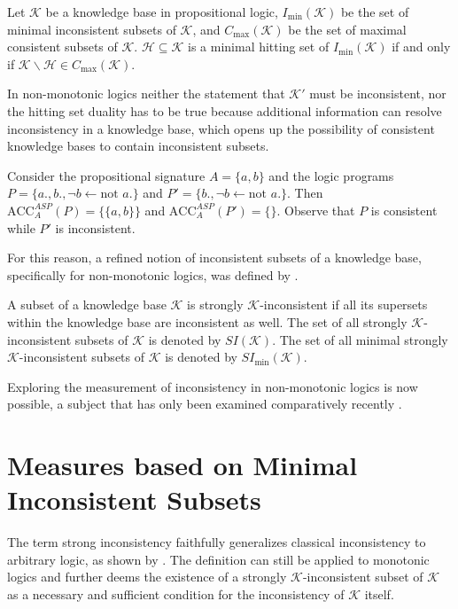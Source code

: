 \begin{theorem}
    Let \(\mathcal{K}\) be a knowledge base in propositional logic, \(I_{\min}(\mathcal{K})\) be the set of minimal inconsistent subsets of \(\mathcal{K}\), and \(C_{\max}(\mathcal{K})\) be the set of maximal consistent subsets of \(\mathcal{K}\). \(\mathcal{H} \subseteq \mathcal{K}\) is a minimal hitting set of \(I_{\min}(\mathcal{K})\) if and only if \(\mathcal{K} \backslash \mathcal{H} \in C_{\max}(\mathcal{K})\).
\end{theorem}

In non-monotonic logics neither the statement that \(\mathcal{K}'\) must be inconsistent, nor the hitting set duality has to be true because additional information can resolve inconsistency in a knowledge base, which opens up the possibility of consistent knowledge bases to contain inconsistent subsets.

\begin{example}
    Consider the propositional signature \(A = \{a, b\}\) and the logic programs \(P = \{a., b., \neg b \leftarrow \text{not }a.\}\) and \(P' = \{b., \neg b \leftarrow \text{not }a.\}\). Then \(\text{ACC}_A^{ASP}(P) = \{\{a,b\}\}\) and \(\text{ACC}_A^{ASP}(P') = \{\}\). Observe that \(P\) is consistent while \(P'\) is inconsistent.
\end{example}

For this reason, a refined notion of inconsistent subsets of a knowledge base, specifically for non-monotonic logics, was defined by \cite{brewka_strong_2017}.
\begin{definition}
    A subset of a knowledge base \(\mathcal{K}\) is strongly \(\mathcal{K}\)-inconsistent if all its supersets within the knowledge base are inconsistent as well. The set of all strongly \(\mathcal{K}\)-inconsistent subsets of \(\mathcal{K}\) is denoted by \(SI(\mathcal{K})\). The set of all minimal strongly \(\mathcal{K}\)-inconsistent subsets of \(\mathcal{K}\) is denoted by \(SI_{\min}(\mathcal{K})\).
\end{definition}

Exploring the measurement of inconsistency in non-monotonic logics is now possible, a subject that has only been examined comparatively recently \cite{ulbricht_measuring_2018} \cite{brewka_strong_2019} \cite{ulbricht_handling_2020}.

\section{Measures based on Minimal Inconsistent Subsets}
The term strong inconsistency faithfully generalizes classical inconsistency to arbitrary logic, as shown by \cite{brewka_strong_2017}. The definition can still be applied to monotonic logics and further deems the existence of a strongly \(\mathcal{K}\)-inconsistent subset of \(\mathcal{K}\) as a necessary and sufficient condition for the inconsistency of \(\mathcal{K}\) itself.

